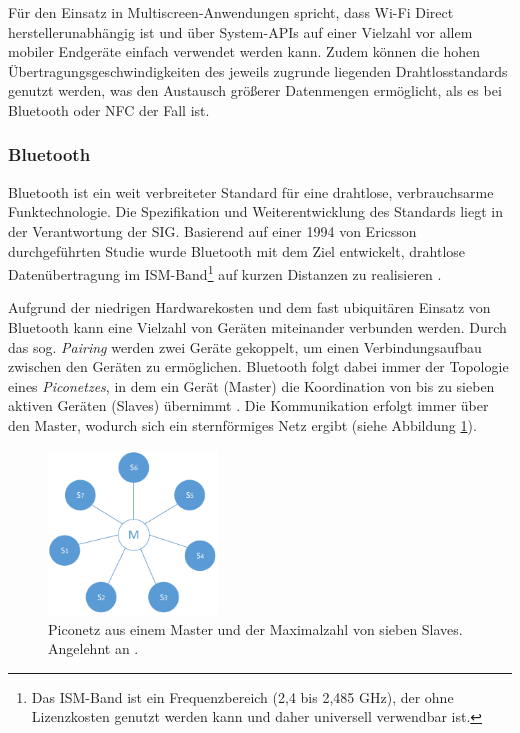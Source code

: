 Für den Einsatz in Multiscreen-Anwendungen spricht, dass Wi-Fi Direct her\-stel\-ler\-un\-ab\-hän\-gig ist und über System-\acsp{API} auf einer Vielzahl vor allem mobiler Endgeräte einfach verwendet werden kann. Zudem können die hohen Übertragungsgeschwindigkeiten des jeweils zugrunde liegenden Drahtlosstandards genutzt werden, was den Austausch größerer Datenmengen ermöglicht, als es \zb bei Bluetooth oder NFC der Fall ist.

\subsubsection{Bluetooth}
\label{subsec:bluetooth}
Bluetooth ist ein weit verbreiteter Standard für eine drahtlose, verbrauchsarme Funktechnologie.
Die Spezifikation und Weiterentwicklung des Standards liegt in der Verantwortung der \ac{SIG}. Basierend auf einer 1994 von Ericsson durchgeführten Studie wurde Bluetooth mit dem Ziel entwickelt, drahtlose Datenübertragung im ISM-Band\footnote{Das \ac{ISM}-Band ist ein Frequenzbereich (2,4 bis 2,485 GHz), der ohne Lizenzkosten genutzt werden kann und daher universell verwendbar ist.} auf kurzen Distanzen zu realisieren \citep[121]{Fuchs2009}.

Aufgrund der niedrigen Hardwarekosten und dem fast ubiquitären Einsatz von Bluetooth kann eine Vielzahl von Geräten miteinander verbunden werden. Durch das sog. \textit{Pairing} werden zwei Geräte gekoppelt, um einen Verbindungsaufbau zwischen den Geräten zu ermöglichen. Bluetooth folgt dabei immer der Topologie eines \textit{Piconetzes}, in dem ein Gerät (Master) die Koordination von bis zu sieben aktiven Geräten (Slaves) übernimmt \citep[579]{Kurose2014}. Die Kommunikation erfolgt immer über den Master, wodurch sich ein sternförmiges Netz ergibt (siehe Abbildung \ref{fig:piconet}).

\begin{figure}[ht]
\centering
\includegraphics[width=0.4\textwidth]{bilder/piconet}
\caption{Piconetz aus einem Master und der Maximalzahl von sieben Slaves. Angelehnt an \citep[125]{Fuchs2009}.}
\label{fig:piconet}
\end{figure}

